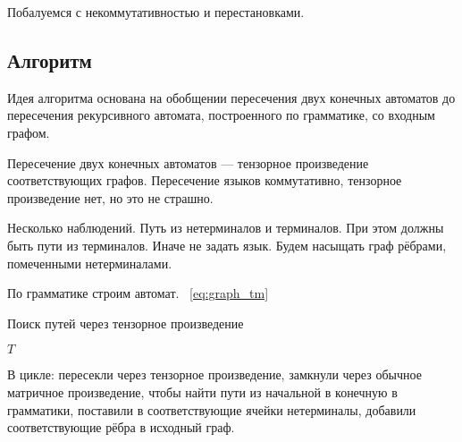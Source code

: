 Побалуемся с некоммутативностью и перестановками.

\subsection{Алгоритм}

Идея алгоритма основана на обобщении пересечения двух конечных автоматов до пересечения рекурсивного автомата, построенного по грамматике, со входным графом.

Пересечение двух конечных автоматов --- тензорное произведение соответствующих графов.
Пересечение языков коммутативно, тензорное произведение нет, но это не страшно.

Несколько наблюдений.
Путь из нетерминалов и терминалов.
При этом должны быть пути из терминалов. Иначе не задать язык.
Будем насыщать граф рёбрами, помеченными нетерминалами.

По грамматике строим автомат.
~\ref{eq:graph_tm}

\begin{algorithm}
\begin{algorithmic}[1]
\caption{Поиск путей через тензорное произведение}
\label{lst:algo1}
    \EndFor
        \For{}
           \For{}
             \If{}
             \EndIf
           \EndFor
        \EndFor
    \EndWhile
\State \Return $T$
\EndFunction
\end{algorithmic}
\end{algorithm}


В цикле: пересекли через тензорное произведение, замкнули через обычное матричное произведение, чтобы найти пути из начальной в конечную в грамматики, поставили в соответствующие ячейки нетерминалы, добавили соответствующие рёбра в исходный граф.


